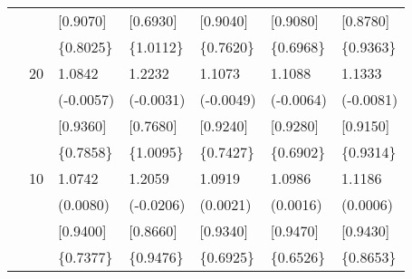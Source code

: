 \begin{table}[ht]
\begin{tabular}{lllllll}
&&[0.9070]&[0.6930]&[0.9040]&[0.9080]&[0.8780]\\
&&\{0.8025\}&\{1.0112\}&\{0.7620\}&\{0.6968\}&\{0.9363\}\\
&20&1.0842&1.2232&1.1073&1.1088&1.1333\\
&&(-0.0057)&(-0.0031)&(-0.0049)&(-0.0064)&(-0.0081)\\
&&[0.9360]&[0.7680]&[0.9240]&[0.9280]&[0.9150]\\
&&\{0.7858\}&\{1.0095\}&\{0.7427\}&\{0.6902\}&\{0.9314\}\\
&10&1.0742&1.2059&1.0919&1.0986&1.1186\\
&&(0.0080)&(-0.0206)&(0.0021)&(0.0016)&(0.0006)\\
&&[0.9400]&[0.8660]&[0.9340]&[0.9470]&[0.9430]\\
&&\{0.7377\}&\{0.9476\}&\{0.6925\}&\{0.6526\}&\{0.8653\}\\
\hline
\end{tabular}
\end{table}

